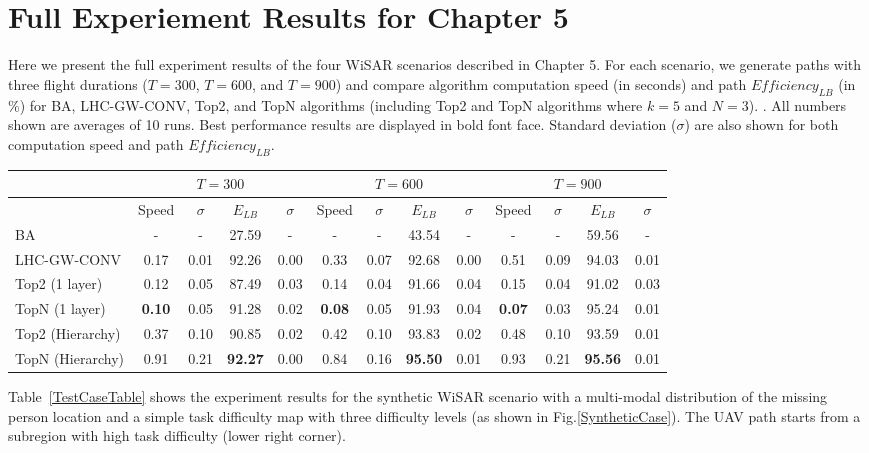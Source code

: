 \chapter{Full Experiement Results for Chapter 5}
\label{chap:result}

Here we present the full experiment results of the four WiSAR scenarios described in Chapter 5. For each scenario, we generate paths with three flight durations ($T=300$, $T=600$, and $T=900$) and compare algorithm computation speed (in seconds) and path $\mathit{Efficiency_{LB}}$ (in \%) for BA, LHC-GW-CONV, Top2, and TopN algorithms (including Top2 and TopN algorithms where $k=5$ and $N=3$). . All numbers shown are averages of 10 runs. Best performance results are displayed in bold font face. Standard deviation ($\sigma$) are also shown for both computation speed and path $\mathit{Efficiency_{LB}}$.

\begin{center}
\begin{table*}
{
\scriptsize
\hfill{}
\setlength{\extrarowheight}{1.5pt}
\begin{tabular}
{|l|c|c|c|c|c|c|c|c|c|c|c|c|}
\hline
& \multicolumn{4}{|c|}{$T=300$} & \multicolumn{4}{|c|}{$T=600$} & \multicolumn{4}{|c|}{$T=900$} \\ 
\hline
& Speed & $\sigma$ & $\mathit{E_{LB}}$ & $\sigma$ & Speed & $\sigma$ & $\mathit{E_{LB}}$ & $\sigma$ & Speed & $\sigma$ & $\mathit{E_{LB}}$ & $\sigma$\\ 
\hline
BA & - & - & 27.59 & - & - & - & 43.54 & - & - & - & 59.56 & - \\ 
\hline
LHC-GW-CONV & 0.17 & 0.01 & 92.26 & 0.00 & 0.33 & 0.07 & 92.68 & 0.00 & 0.51 & 0.09 & 94.03 & 0.01 \\ 
\hline
Top2 (1 layer) & 0.12 & 0.05 & 87.49 & 0.03 & 0.14 & 0.04 & 91.66 & 0.04 & 0.15 & 0.04 & 91.02 & 0.03 \\ 
\hline
TopN (1 layer) & \textbf{0.10} & 0.05 & 91.28 & 0.02 & \textbf{0.08} & 0.05 & 91.93 & 0.04 & \textbf{0.07} & 0.03 & 95.24 & 0.01 \\ 
\hline
Top2 (Hierarchy) & 0.37 & 0.10 & 90.85 & 0.02 & 0.42 & 0.10 & 93.83 & 0.02 & 0.48 & 0.10 & 93.59 & 0.01  \\ 
\hline
TopN (Hierarchy) & 0.91 & 0.21 & \textbf{92.27} & 0.00 & 0.84 & 0.16 & \textbf{95.50} & 0.01 & 0.93 & 0.21 & \textbf{95.56} & 0.01 \\ 
\hline
\end{tabular}}
\medskip
\caption{Algorithms speed and $\mathit{Efficiency_{LB}}$ comparison for the multi-modal synthetic scenario.}
\label{TestCaseTable}
\end{table*}
\end{center}
Table~\ref{TestCaseTable} shows the experiment results for the synthetic WiSAR scenario with a multi-modal distribution of the missing person location and a simple task difficulty map with three difficulty levels (as shown in Fig.\ref{SyntheticCase}). The UAV path starts from a subregion with high task difficulty (lower right corner).

